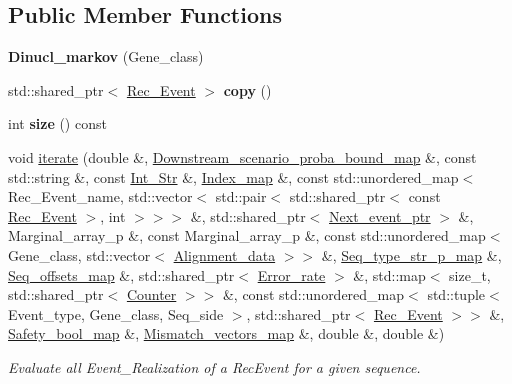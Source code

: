 \subsection*{Public Member Functions}
\begin{DoxyCompactItemize}
\item 
\mbox{\label{classDinucl__markov_a7c4b9c77a45d66a4bb540a12cc75073a}} 
{\bfseries Dinucl\+\_\+markov} (Gene\+\_\+class)
\item 
\mbox{\label{classDinucl__markov_aef20fac2861787b1f03143dbd4a8224d}} 
std\+::shared\+\_\+ptr$<$ \hyperlink{classRec__Event}{Rec\+\_\+\+Event} $>$ {\bfseries copy} ()
\item 
\mbox{\label{classDinucl__markov_a5080c4cf4545622858c5afb7c3130fa9}} 
int {\bfseries size} () const
\item 
void \hyperlink{classDinucl__markov_ace49d0da113be7d77ad0d4c3b8152c3d}{iterate} (double \&, \hyperlink{classEnum__fast__memory__map}{Downstream\+\_\+scenario\+\_\+proba\+\_\+bound\+\_\+map} \&, const std\+::string \&, const \hyperlink{classInt__Str}{Int\+\_\+\+Str} \&, \hyperlink{classEnum__fast__memory__map}{Index\+\_\+map} \&, const std\+::unordered\+\_\+map$<$ Rec\+\_\+\+Event\+\_\+name, std\+::vector$<$ std\+::pair$<$ std\+::shared\+\_\+ptr$<$ const \hyperlink{classRec__Event}{Rec\+\_\+\+Event} $>$, int $>$$>$$>$ \&, std\+::shared\+\_\+ptr$<$ \hyperlink{classRec__Event}{Next\+\_\+event\+\_\+ptr} $>$ \&, Marginal\+\_\+array\+\_\+p \&, const Marginal\+\_\+array\+\_\+p \&, const std\+::unordered\+\_\+map$<$ Gene\+\_\+class, std\+::vector$<$ \hyperlink{structAlignment__data}{Alignment\+\_\+data} $>$$>$ \&, \hyperlink{classEnum__fast__memory__map}{Seq\+\_\+type\+\_\+str\+\_\+p\+\_\+map} \&, \hyperlink{classEnum__fast__memory__dual__key__map}{Seq\+\_\+offsets\+\_\+map} \&, std\+::shared\+\_\+ptr$<$ \hyperlink{classError__rate}{Error\+\_\+rate} $>$ \&, std\+::map$<$ size\+\_\+t, std\+::shared\+\_\+ptr$<$ \hyperlink{classCounter}{Counter} $>$$>$ \&, const std\+::unordered\+\_\+map$<$ std\+::tuple$<$ Event\+\_\+type, Gene\+\_\+class, Seq\+\_\+side $>$, std\+::shared\+\_\+ptr$<$ \hyperlink{classRec__Event}{Rec\+\_\+\+Event} $>$$>$ \&, \hyperlink{classEnum__fast__memory__map}{Safety\+\_\+bool\+\_\+map} \&, \hyperlink{classEnum__fast__memory__map}{Mismatch\+\_\+vectors\+\_\+map} \&, double \&, double \&)
\begin{DoxyCompactList}\small\item\em Evaluate all Event\+\_\+\+Realization of a Rec\+Event for a given sequence. \end{DoxyCompactList}\item 
$$
\end{DoxyCompactItemize}
